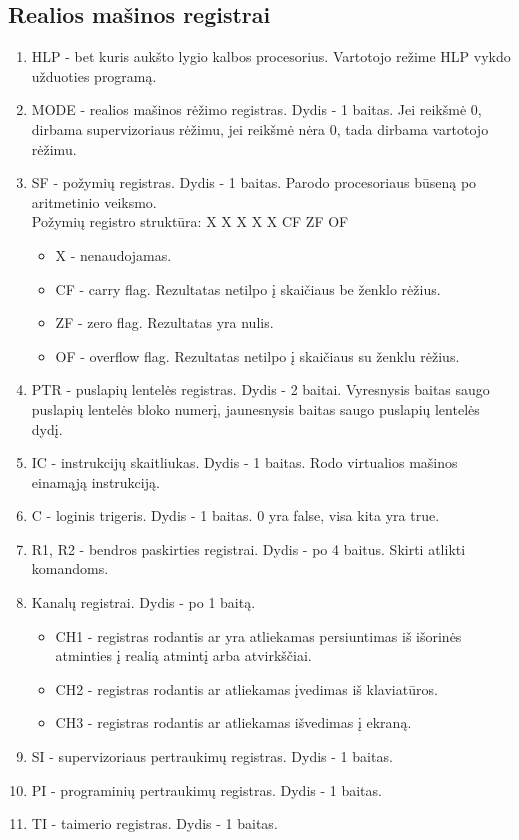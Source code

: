 	\subsection{Realios mašinos registrai}
	\begin{enumerate}
	\item HLP - bet kuris aukšto lygio kalbos procesorius. Vartotojo režime HLP vykdo užduoties programą.
	\item MODE - realios mašinos rėžimo registras. Dydis - 1 baitas. Jei reikšmė 0, dirbama supervizoriaus rėžimu, jei reikšmė nėra 0, tada dirbama vartotojo rėžimu.
	\item SF - požymių registras. Dydis - 1 baitas. Parodo procesoriaus būseną po aritmetinio veiksmo.\\
	Požymių registro struktūra: X X X X X CF ZF OF
	\begin{itemize}
		\item X - nenaudojamas.
		\item CF - carry flag. Rezultatas netilpo į skaičiaus be ženklo rėžius.
		\item ZF - zero flag. Rezultatas yra nulis.
		\item OF - overflow flag. Rezultatas netilpo į skaičiaus su ženklu rėžius.
	\end{itemize}
	\item PTR - puslapių lentelės registras. Dydis - 2 baitai. Vyresnysis baitas saugo puslapių lentelės bloko numerį, jaunesnysis baitas saugo puslapių lentelės dydį.
	\item IC - instrukcijų skaitliukas. Dydis - 1 baitas. Rodo virtualios mašinos einamąją instrukciją.
	\item C - loginis trigeris. Dydis - 1 baitas. 0 yra false, visa kita yra true.
	\item R1, R2 - bendros paskirties registrai. Dydis - po 4 baitus. Skirti atlikti komandoms.
	\item Kanalų registrai. Dydis - po 1 baitą.
	\begin{itemize}
		\item CH1 - registras rodantis ar yra atliekamas persiuntimas iš išorinės atminties į realią atmintį arba atvirkščiai.
		\item CH2 - registras rodantis ar atliekamas įvedimas iš klaviatūros.
		\item CH3 - registras rodantis ar atliekamas išvedimas į ekraną.
	\end{itemize}
	\item SI - supervizoriaus pertraukimų registras. Dydis - 1 baitas. 
	\item PI - programinių pertraukimų registras. Dydis - 1 baitas.
	\item TI - taimerio registras. Dydis - 1 baitas.
	
	\end{enumerate}	
	
